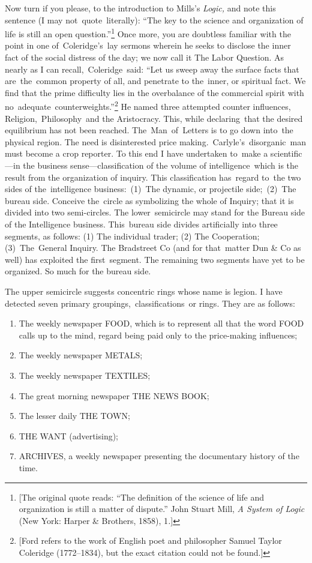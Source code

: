 \documentclass[openany,nobib]{tufte-book}
\begin{document}
Now turn if you please, to the introduction to Mills's \emph{Logic,} and
note this sentence (I may not~quote~literally): ``The key to the science
and organization of life is still an open question.''\footnote{{[}The
  original quote reads: ``The definition of the science of life and
  organization is still a matter of dispute.'' John Stuart Mill, \emph{A
  System of Logic} (New York: Harper \& Brothers, 1858), 1\emph{.}{]}}
Once more, you are doubtless familiar with the point in one
of~Coleridge's~lay sermons wherein he seeks to disclose the inner fact
of the social distress of the day; we now call it The Labor Question. As
nearly as I can recall,~Coleridge~said: ``Let us sweep away the surface
facts that are~the~common property of all, and penetrate to the~inner,
or spiritual fact. We find that the prime difficulty lies in the
overbalance of the commercial spirit with
no~adequate~counterweights.''\footnote{{[}Ford refers to the work of
  English poet and philosopher Samuel Taylor Coleridge (1772--1834), but
  the exact citation could not be found.{]}} He named three attempted
counter influences, Religion,~Philosophy~and the Aristocracy. This,
while declaring~that the desired equilibrium has not been reached.
The~Man~of~Letters is to go down into~the physical region. The need is
disinterested price making.~Carlyle's~disorganic~man must become a crop
reporter. To this end I have undertaken to~make a scientific---in the
business sense---classification of the volume of intelligence~which is
the result from the organization of inquiry. This classification
has~regard to~the two sides of the~intelligence business:~(1)~The
dynamic, or projectile side;~(2)~The bureau side. Conceive the~circle as
symbolizing the whole of Inquiry; that it is divided into two
semi-circles. The lower~semicircle may stand for the Bureau side of the
Intelligence business. This~bureau side divides artificially into three
segments, as follows: (1) The individual trader; (2) The Cooperation;
(3)~The~General Inquiry. The Bradstreet Co (and for that~matter Dun \&
Co as well) has exploited the first~segment. The remaining two segments
have yet to be organized. So much for the bureau side.~

The upper semicircle suggests concentric rings whose name is legion. I
have detected seven primary groupings,~classifications~or rings. They
are as follows:~

\begin{enumerate}
\item
  The weekly newspaper FOOD, which is to represent all that the word
  FOOD calls up to the mind, regard being paid only to the price-making
  influences;~
\item
  The weekly newspaper METALS;~
\item
  The weekly newspaper TEXTILES;~
\item
  The great morning newspaper THE NEWS BOOK;~
\item
  The lesser daily THE TOWN;~
\item
  THE WANT (advertising);~
\item
  ARCHIVES, a weekly newspaper presenting the documentary history of the
  time.~~
\end{enumerate}
\end{document}

